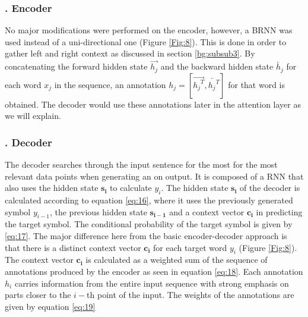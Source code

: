 
\subsubsection{. Encoder} 
\label{bg:subsub9}
No major modifications were performed on the encoder, however, a \ac{BRNN} was used instead of a uni-directional one (Figure \ref{Fig:8}). This is done in order to gather left and right context as discussed in section \ref{bg:subsub3}. By concatenating the forward hidden state $ {\overrightarrow{{h_j}}}$ and the backward hidden state $ {\overleftarrow{{h_j}}}$ for each word $x_j$ in the sequence, an annotation ${h_j}=[{\overrightarrow{{{h_j}^T}}}, {\overleftarrow{{{h_j}^T}}}] $ for that word is obtained. The decoder would use these annotations later in the attention layer as we will explain.

\subsubsection{. Decoder} 
\label{bg:subsub10}

The decoder searches through the input sentence for the most for the most relevant data points when generating an on output. It is composed of a  \ac{RNN} that also uses the hidden state $ \mathbf{s_i}$ to calculate $ y_i$. The hidden state $ \mathbf{s_i}$ of the decoder is calculated according to equation \ref{eq:16}, where it uses the previously generated symbol $y_{i-1}$, the previous hidden state $\mathbf{s_{i-1}}$ and a context vector $\mathbf{c_i}$ in predicting the target symbol. The conditional probability of the target symbol is given by \ref{eq:17}. The major difference here from the basic encoder-decoder approach is that there is a distinct context vector $\mathbf{c_i}$ for each target word $y_i$ (Figure \ref{Fig:8}). The context vector $\mathbf{c_i}$ is calculated as a weighted sum of the sequence of annotations produced by the encoder as seen in equation \ref{eq:18}. Each annotation $h_i$ carries information from the entire input sequence with strong emphasis on parts closer to the $i-$th point of the input. The weights of the annotations are given by equation \ref{eq:19}


